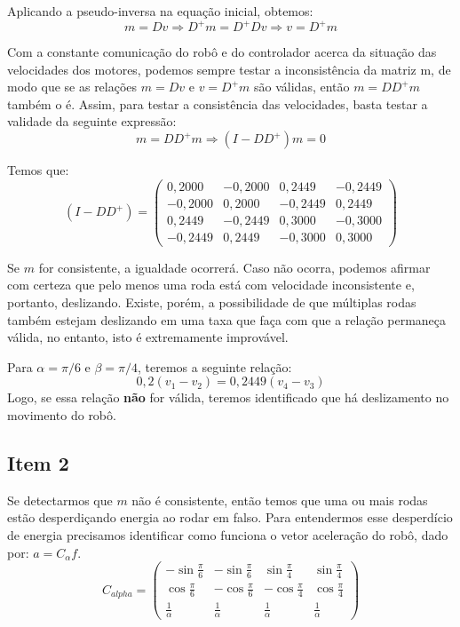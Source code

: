 \documentclass{article}
\begin{document}
\hspace{1cm} Aplicando a pseudo-inversa na equação inicial, obtemos:
\[ m = Dv \Rightarrow D^+m = D^+Dv \Rightarrow v = D^+m\]

Com a constante comunicação do robô e do controlador acerca da situação das velocidades dos motores, podemos sempre testar a inconsistência da matriz m, de modo que se as relações $m = Dv$ e $v = D^+m$ são válidas, então $m = DD^+m$ também o é. Assim, para testar a consistência das velocidades, basta testar a validade da seguinte expressão:
\[ m = DD^+m \Rightarrow (I - DD^+)m = 0\]

Temos que:
\[(I - DD^+)
=
\begin{pmatrix}
  0,2000    &-0,2000    & 0,2449    & -0,2449    \\
 -0,2000 &  0,2000 & -0,2449 & 0,2449 \\
 0,2449 & -0,2449 &  0,3000  & -0,3000 \\
 -0,2449 & 0,2449 & -0,3000  & 0,3000
 \end{pmatrix}
\]


Se $m$ for consistente, a igualdade ocorrerá. Caso não ocorra, podemos afirmar com certeza que pelo menos uma roda está com velocidade inconsistente e, portanto, deslizando. Existe, porém, a possibilidade de que múltiplas rodas também estejam deslizando em uma taxa que faça com que a relação permaneça válida, no entanto, isto é extremamente improvável.

Para $\alpha = \pi/6$ e $\beta = \pi/4$, teremos a seguinte relação:
\[0,2(v_1 - v_2) = 0,2449(v_4 - v_3)\]
Logo, se essa relação \textbf{não} for válida, teremos identificado que há deslizamento no movimento do robô.

\subsection{Item 2}

\hspace{1cm}Se detectarmos que $m$ não é consistente, então temos que uma ou mais rodas estão desperdiçando energia ao rodar em falso. Para entendermos esse desperdício de energia precisamos identificar como funciona o vetor aceleração do robô, dado por: $ a = C_{\alpha}f$.
\[C_{alpha}
=
\begin{pmatrix}
  -\sin{\frac{\pi}{6}} & -\sin{\frac{\pi}{6}} & \sin{\frac{\pi}{4}} & \sin{\frac{\pi}{4}} \\
  \cos{\frac{\pi}{6}} &  -\cos{\frac{\pi}{6}} &  -\cos{\frac{\pi}{4}} &  \cos{\frac{\pi}{4}} \\
 \frac{1}{\alpha} & \frac{1}{\alpha} &\frac{1}{\alpha} & \frac{1}{\alpha}
 \end{pmatrix}
\]
\end{document}
